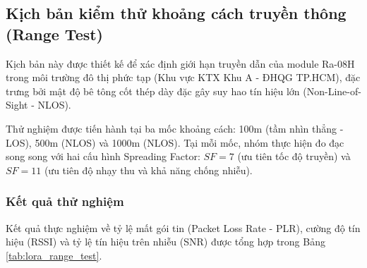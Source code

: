 

\subsection{Kịch bản kiểm thử khoảng cách truyền thông (Range Test)}
Kịch bản này được thiết kế để xác định giới hạn truyền dẫn của module Ra-08H trong môi trường đô thị phức tạp (Khu vực KTX Khu A - ĐHQG TP.HCM), đặc trưng bởi mật độ bê tông cốt thép dày đặc gây suy hao tín hiệu lớn (Non-Line-of-Sight - NLOS).

Thử nghiệm được tiến hành tại ba mốc khoảng cách: 100m (tầm nhìn thẳng - LOS), 500m (NLOS) và 1000m (NLOS). Tại mỗi mốc, nhóm thực hiện đo đạc song song với hai cấu hình Spreading Factor: $SF=7$ (ưu tiên tốc độ truyền) và $SF=11$ (ưu tiên độ nhạy thu và khả năng chống nhiễu).


\subsubsection{Kết quả thử nghiệm}
Kết quả thực nghiệm về tỷ lệ mất gói tin (Packet Loss Rate - PLR), cường độ tín hiệu (RSSI) và tỷ lệ tín hiệu trên nhiễu (SNR) được tổng hợp trong Bảng \ref{tab:lora_range_test}.

